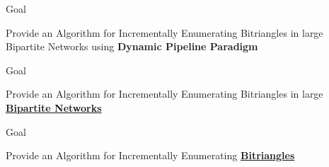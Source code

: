 \begin{frame}[fragile]{Goal}
  \begin{center}
    Provide an Algorithm for Incrementally Enumerating Bitriangles in large Bipartite Networks using \textbf{Dynamic Pipeline Paradigm}
  \end{center}    
\end{frame}

\begin{frame}[fragile]{Goal}
  \begin{center}
    {\color{light}Provide an Algorithm for Incrementally Enumerating Bitriangles in large} \underline{{\color{red}\textbf{Bipartite Networks}}} {}
  \end{center}    
  \begin{figure}
    \centering
  \end{figure}
\end{frame}

\begin{frame}[fragile]{Goal}
  \begin{center}
    {\color{light}Provide an Algorithm for Incrementally Enumerating} \underline{{\color{red}\textbf{Bitriangles}}} {}
  \end{center}    
  \begin{figure}
    \centering
  \end{figure}
\end{frame}

